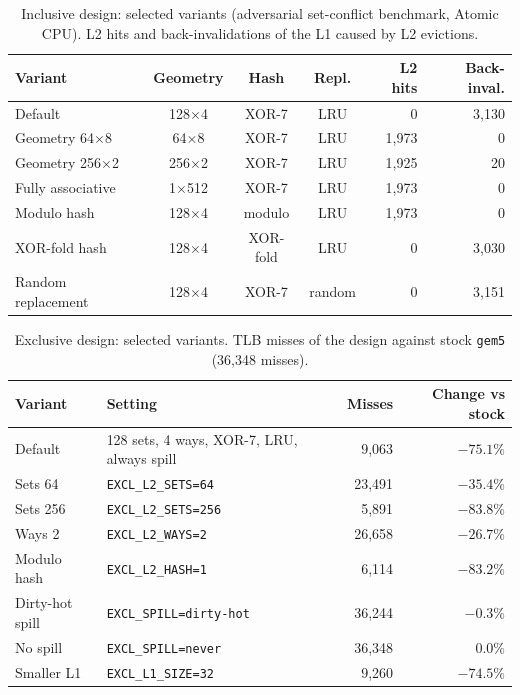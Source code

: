 \begin{table}[htbp]
\centering
\small
\caption{Inclusive design: selected variants (adversarial set-conflict benchmark, Atomic CPU). L2 hits and back-invalidations of the L1 caused by L2 evictions.}
\label{tab:sweep_inc}
\begin{tabular}{l c c c r r}
\toprule
\textbf{Variant} & \textbf{Geometry} & \textbf{Hash} & \textbf{Repl.} & \textbf{L2 hits} & \textbf{Back-inval.} \\
\midrule
Default & 128$\times$4 & XOR-7 & LRU & 0 & 3,130 \\
Geometry 64$\times$8 & 64$\times$8 & XOR-7 & LRU & 1,973 & 0 \\
Geometry 256$\times$2 & 256$\times$2 & XOR-7 & LRU & 1,925 & 20 \\
Fully associative & 1$\times$512 & XOR-7 & LRU & 1,973 & 0 \\
Modulo hash & 128$\times$4 & modulo & LRU & 1,973 & 0 \\
XOR-fold hash & 128$\times$4 & XOR-fold & LRU & 0 & 3,030 \\
Random replacement & 128$\times$4 & XOR-7 & random & 0 & 3,151 \\
\bottomrule
\end{tabular}
\end{table}

\begin{table}[htbp]
\centering
\small
\caption{Exclusive design: selected variants. TLB misses of the design against stock \texttt{gem5} (36,348 misses).}
\label{tab:sweep_excl}
\begin{tabular}{l l r r}
\toprule
\textbf{Variant} & \textbf{Setting} & \textbf{Misses} & \textbf{Change vs stock} \\
\midrule
Default & 128 sets, 4 ways, XOR-7, LRU, always spill & 9,063 & $-75.1\%$ \\
Sets 64 & \texttt{EXCL\_L2\_SETS=64} & 23,491 & $-35.4\%$ \\
Sets 256 & \texttt{EXCL\_L2\_SETS=256} & 5,891 & $-83.8\%$ \\
Ways 2 & \texttt{EXCL\_L2\_WAYS=2} & 26,658 & $-26.7\%$ \\
Modulo hash & \texttt{EXCL\_L2\_HASH=1} & 6,114 & $-83.2\%$ \\
Dirty-hot spill & \texttt{EXCL\_SPILL=dirty-hot} & 36,244 & $-0.3\%$ \\
No spill & \texttt{EXCL\_SPILL=never} & 36,348 & $0.0\%$ \\
Smaller L1 & \texttt{EXCL\_L1\_SIZE=32} & 9,260 & $-74.5\%$ \\
\bottomrule
\end{tabular}
\end{table}


